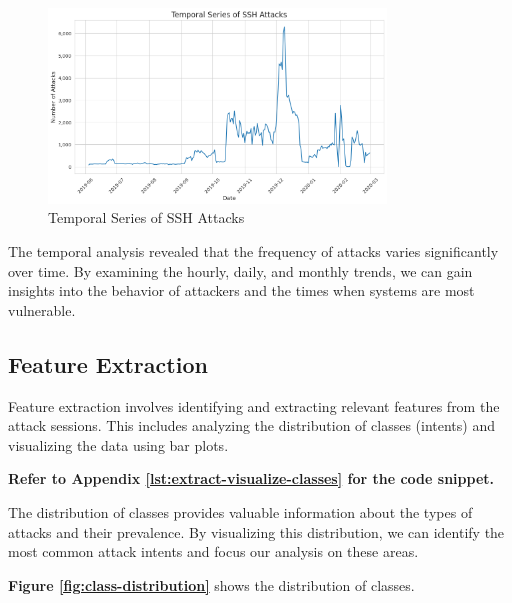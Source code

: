         \begin{figure}[h]
            \centering
            \includegraphics[width=0.8\textwidth]{../figures/plots/section1/temporal_series_of_ssh_attacks.png}
            \caption{Temporal Series of SSH Attacks}
            \label{fig:temporal-analysis}
        \end{figure}

        The temporal analysis revealed that the frequency of attacks varies significantly over time. By examining the hourly, daily, and monthly trends, we can gain insights into the behavior of attackers and the times when systems are most vulnerable.

    \subsection{Feature Extraction}
    
        Feature extraction involves identifying and extracting relevant features from the attack sessions. This includes analyzing the distribution of classes (intents) and visualizing the data using bar plots.
            
        \textbf{Refer to Appendix \ref{lst:extract-visualize-classes} for the code snippet.}

        The distribution of classes provides valuable information about the types of attacks and their prevalence. By visualizing this distribution, we can identify the most common attack intents and focus our analysis on these areas.

        \textbf{Figure \ref{fig:class-distribution}} shows the distribution of classes.

